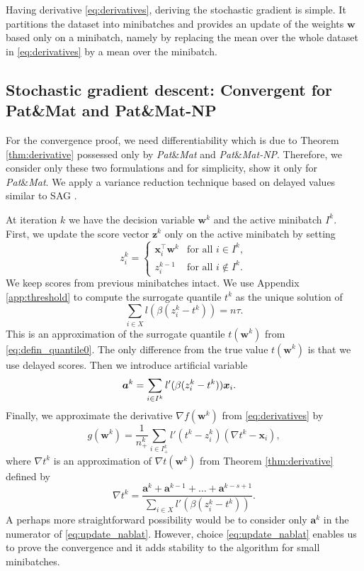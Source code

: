 \documentclass[]{interact}
\theoremstyle{plain}%
\theoremstyle{definition}
\theoremstyle{remark}
\newcommand{\apatmat}{Pat\&Mat\xspace}
\newcommand{\anpB}{Pat\&Mat-NP\xspace}
\newcommand{\patmat}{\emph{Pat}\&\emph{Mat}\xspace}
\newcommand{\npB}{{\emph{Pat}\&\emph{Mat-NP}}\xspace}
\begin{document}
Having derivative \eqref{eq:derivatives}, deriving the stochastic gradient is simple. It partitions the dataset into minibatches and provides an update of the weights $\bm w$ based only on a minibatch, namely by replacing the mean over the whole dataset in \eqref{eq:derivatives} by a mean over the minibatch.


\subsection{Stochastic gradient descent: Convergent for \apatmat and \anpB}

For the convergence proof, we need differentiability which is due to Theorem \ref{thm:derivative} possessed only by \patmat and \npB. Therefore, we consider only these two formulations and for simplicity, show it only for \patmat. We apply a variance reduction technique based on delayed values similar to SAG \cite{schmidt2017minimizing}. 

At iteration $k$ we have the decision variable $\bm w^k$ and the active minibatch $I^k$. First, we update the score vector $\bm z^k$ only on the active minibatch by setting
\begin{equation}\label{eq:defin_z}
z_i^k = \begin{cases} \bm x_i^\top \bm w^k &\text{for all }i\in I^k,\\ z_i^{k-1} &\text{for all }i\notin I^k.\end{cases} 
\end{equation}
We keep scores from previous minibatches intact. We use Appendix \ref{app:threshold} to compute the surrogate quantile $t^k$ as the unique solution of
\begin{equation}\label{eq:update_t}
\sum_{i\in X}l(\beta(z_i^k-t^k)) = n\tau.
\end{equation}
This is an approximation of the surrogate quantile $t(\bm w^k)$ from \eqref{eq:defin_quantile0}. The only difference from the true value $t(\bm w^k)$ is that we use delayed scores. Then we introduce artificial variable
\begin{equation}\label{eq:update_a}
\aligned
\bm a^k &= \sum_{i\in I^k}l'(\beta(z_i^k-t^k))\bm x_i.
\endaligned
\end{equation}
Finally, we approximate the derivative $\nabla f(\bm w^k)$ from \eqref{eq:derivatives} by
\begin{equation}\label{eq:update_g}
g(\bm w^k)=\frac{1}{n^k_+}\sum_{i\in I^k_+}l'(t^k-z_i^k)(\nabla t^k - \bm x_i),
\end{equation}
where $\nabla t^k$ is an approximation of $\nabla t(\bm w^k)$ from Theorem \ref{thm:derivative} defined by
\begin{equation}\label{eq:update_nablat}
\nabla t^k = \frac{\bm a^k+\bm a^{k-1}+\dots+\bm a^{k-s+1}}{\sum_{i\in X}l'(\beta(z_i^k-t^k))}.
\end{equation}
A perhaps more straightforward possibility would be to consider only $\bm a^k$ in the numerator of \eqref{eq:update_nablat}. However, choice \eqref{eq:update_nablat} enables us to prove the convergence and it adds stability to the algorithm for small minibatches.
\end{document}
